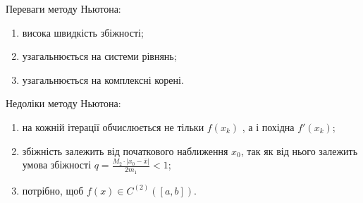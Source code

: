 Переваги методу Ньютона: 
\begin{enumerate}
\item висока швидкість збіжності;
\item узагальнюється на системи рівнянь; 
\item узагальнюється на комплексні корені.
\end{enumerate}
Недоліки методу Ньютона: 
\begin{enumerate}
	\item на кожній ітерації обчислюється не тільки $f (x_k )$ , а і похідна $f'(x_k)$;
	\item  збіжність залежить від початкового наближення $x_0$, так як від нього залежить умова збіжності $q = \frac{M_2\cdot |x_0-\overline{x}|}{2m_1} < 1$;
	\item потрібно, щоб $f (x)\in C^{(2)}([a,b])$.
\end{enumerate}
